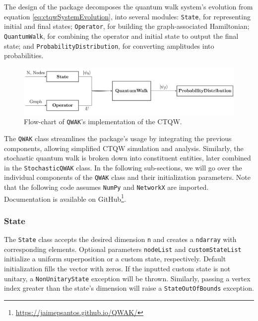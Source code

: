 \documentclass[../../dissertation.tex]{subfiles}
\begin{document}
The design of the package decomposes the quantum walk system's evolution from
equation \eqref{eq:ctqwSystemEvolution}, into several modules: \texttt{State},
for representing initial and final states; \texttt{Operator}, for building the
graph-associated Hamiltonian; \texttt{QuantumWalk}, for combining the operator
and initial state to output the final state; and
\texttt{ProbabilityDistribution}, for converting amplitudes into probabilities.

\begin{figure}[!h]
    \centering
    \includegraphics[width=12cm]{img/QWAK/qwakDiagram.jpg}
    \caption{Flow-chart of \texttt{QWAK}'s implementation of the CTQW.}
    \label{fig:oriented_line}
\end{figure}

The \texttt{QWAK} class streamlines the package's usage by integrating the
previous components, allowing simplified CTQW simulation and analysis.
Similarly, the stochastic quantum walk is broken down into constituent
entities, later combined in the \texttt{StochasticQWAK} class. In the following
sub-sections, we will go over the individual components of the \texttt{QWAK}
class and their initialization parameters. Note that the following code assumes
\texttt{NumPy} and \texttt{NetworkX} are imported. Documentation is available
on GitHub\footnote{\url{https://jaimepsantos.github.io/QWAK/}}.


\subsubsection{State}

The \texttt{State} class accepts the desired dimension \texttt{n} and creates a
\texttt{ndarray} with corresponding elements. Optional parameters
\texttt{nodeList} and \texttt{customStateList} initialize a uniform
superposition or a custom state, respectively. Default initialization fills
the vector with zeros. If the inputted custom state is not unitary, a
\texttt{NonUnitaryState} exception will be thrown. Similarly, passing a vertex index
greater than the state's dimension will raise a \texttt{StateOutOfBounds}
exception.
\end{document}
